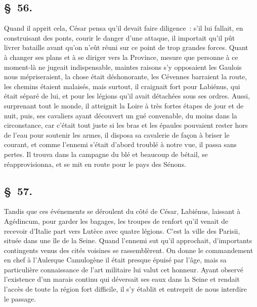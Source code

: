 \documentclass[french,twoside]{book} %
\begin{document}
\subsection[{§ 56.}]{ \textsc{§ 56.} }
\noindent Quand il apprit cela, César pensa qu’il devait faire diligence : s’il lui fallait, en construisant des ponts, courir le danger d’une attaque, il importait qu’il pût livrer bataille avant qu’on n’eût réuni sur ce point de trop grandes forces. Quant à changer ses plans et à se diriger vers la Province, mesure que personne à ce moment-là ne jugeait indispensable, maintes raisons s’y opposaient les Gaulois nous mépriseraient, la chose était déshonorante, les Cévennes barraient la route, les chemins étaient malaisés, mais surtout, il craignait fort pour Labiénus, qui était séparé de lui, et pour les légions qu’il avait détachées sous ses ordres. Aussi, surprenant tout le monde, il atteignit la Loire à très fortes étapes de jour et de nuit, puis, ses cavaliers ayant découvert un gué convenable, du moins dans la circonstance, car c’était tout juste si les bras et les épaules pouvaient rester hors de l’eau pour soutenir les armes, il disposa sa cavalerie de façon à briser le courant, et comme l’ennemi s’était d’abord troublé à notre vue, il passa sans pertes. Il trouva dans la campagne du blé et beaucoup de bétail, se réapprovisionna, et se mit en route pour le pays des Sénons.
\subsection[{§ 57.}]{ \textsc{§ 57.} }
\noindent Tandis que ces événements se déroulent du côté de César, Labiénus, laissant à Agédincum, pour garder les bagages, les troupes de renfort qu’il venait de recevoir d’Italie part vers Lutèce avec quatre légions. C'est la ville des Parisii, située dans une île de la Seine. Quand l’ennemi sut qu’il approchait, d’importants contingents venus des cités voisines se rassemblèrent. On donne le commandement en chef à l’Aulerque Camulogène il était presque épuisé par l’âge, mais sa particulière connaissance de l’art militaire lui valut cet honneur. Ayant observé l’existence d’un marais continu qui déversait ses eaux dans la Seine et rendait l’accès de toute la région fort difficile, il s’y établit et entreprit de nous interdire le passage.
\end{document}
